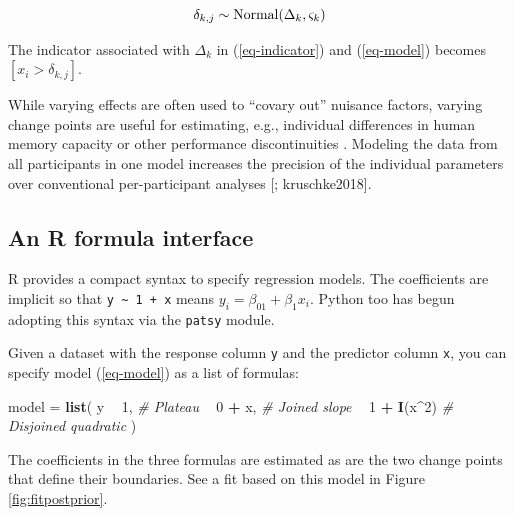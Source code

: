 \documentclass[
  american,
]{article}
\newenvironment{Shaded}{\begin{snugshade}}{\end{snugshade}}
\newcommand{\CommentTok}[1]{\textcolor[rgb]{0.56,0.35,0.01}{\textit{#1}}}
\newcommand{\DecValTok}[1]{\textcolor[rgb]{0.00,0.00,0.81}{#1}}
\newcommand{\KeywordTok}[1]{\textcolor[rgb]{0.13,0.29,0.53}{\textbf{#1}}}
\newcommand{\NormalTok}[1]{#1}
\newcommand{\OperatorTok}[1]{\textcolor[rgb]{0.81,0.36,0.00}{\textbf{#1}}}
\newcommand{\StringTok}[1]{\textcolor[rgb]{0.31,0.60,0.02}{#1}}
\begin{document}
\begin{equation}
\delta_{k, j} \sim {\rm Normal}(\Delta_k, \varsigma_k)
\end{equation}

The indicator associated with \(\Delta_k\) in (\ref{eq-indicator}) and (\ref{eq-model}) becomes \([x_i > \delta_{k, j}]\).

While varying effects are often used to ``covary out'' nuisance factors, varying change points are useful for estimating, e.g., individual differences in human memory capacity or other performance discontinuities \citep{lindelov2018}. Modeling the data from all participants in one model increases the precision of the individual parameters over conventional per-participant analyses {[}\citet{leibovich-raveh2018}; kruschke2018{]}.

\hypertarget{segments_api}{%
\subsection{An R formula interface}\label{segments_api}}

R \citep{rcoreteam2019} provides a compact syntax to specify regression models. The coefficients are implicit so that \texttt{y\ \textasciitilde{}\ 1\ +\ x} means \(y_i = \beta_01 + \beta_1x_i\). Python too has begun adopting this syntax via the \texttt{patsy} module.

Given a dataset with the response column \texttt{y} and the predictor column \texttt{x}, you can specify model (\ref{eq-model}) as a list of formulas:

\begin{Shaded}
\begin{Highlighting}[]
\NormalTok{model =}\StringTok{ }\KeywordTok{list}\NormalTok{(}
\NormalTok{  y }\OperatorTok{~}\StringTok{ }\DecValTok{1}\NormalTok{,          }\CommentTok{# Plateau}
    \OperatorTok{~}\StringTok{ }\DecValTok{0} \OperatorTok{+}\StringTok{ }\NormalTok{x,      }\CommentTok{# Joined slope}
    \OperatorTok{~}\StringTok{ }\DecValTok{1} \OperatorTok{+}\StringTok{ }\KeywordTok{I}\NormalTok{(x}\OperatorTok{^}\DecValTok{2}\NormalTok{)  }\CommentTok{# Disjoined quadratic}
\NormalTok{)}
\end{Highlighting}
\end{Shaded}

The coefficients in the three formulas are estimated as are the two change points that define their boundaries. See a fit based on this model in Figure \ref{fig:fitpostprior}.
\end{document}
